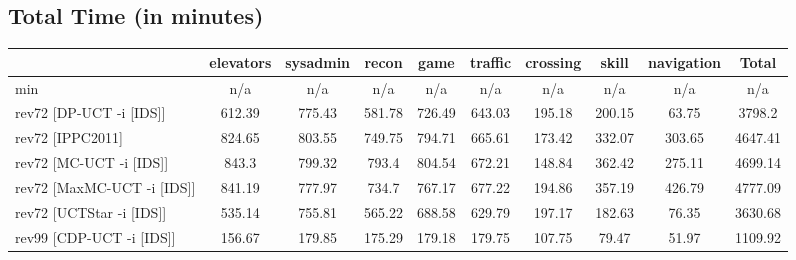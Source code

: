 \documentclass{article}
\begin{document}
\bigskip

\subsection*{Total Time (in minutes)}

\begin{tabular}{|l|r@{$\pm$}rr@{$\pm$}rr@{$\pm$}rr@{$\pm$}rr@{$\pm$}rr@{$\pm$}rr@{$\pm$}rr@{$\pm$}rr@{$\pm$}r|}
\hline

& \multicolumn{2}{c}{elevators}
& \multicolumn{2}{c}{sysadmin}
& \multicolumn{2}{c}{recon}
& \multicolumn{2}{c}{game}
& \multicolumn{2}{c}{traffic}
& \multicolumn{2}{c}{crossing}
& \multicolumn{2}{c}{skill}
& \multicolumn{2}{c}{navigation}
& \multicolumn{2}{c|}{Total}
\\
\hline
\hline
min
& \multicolumn{2}{c}{n/a}
& \multicolumn{2}{c}{n/a}
& \multicolumn{2}{c}{n/a}
& \multicolumn{2}{c}{n/a}
& \multicolumn{2}{c}{n/a}
& \multicolumn{2}{c}{n/a}
& \multicolumn{2}{c}{n/a}
& \multicolumn{2}{c}{n/a}
& \multicolumn{2}{c|}{n/a}
\\
rev72 [DP-UCT -i [IDS]]
& \multicolumn{2}{c}{612.39}
& \multicolumn{2}{c}{775.43}
& \multicolumn{2}{c}{581.78}
& \multicolumn{2}{c}{726.49}
& \multicolumn{2}{c}{643.03}
& \multicolumn{2}{c}{195.18}
& \multicolumn{2}{c}{200.15}
& \multicolumn{2}{c}{63.75}
& \multicolumn{2}{c|}{3798.2}
\\
rev72 [IPPC2011]
& \multicolumn{2}{c}{824.65}
& \multicolumn{2}{c}{803.55}
& \multicolumn{2}{c}{749.75}
& \multicolumn{2}{c}{794.71}
& \multicolumn{2}{c}{665.61}
& \multicolumn{2}{c}{173.42}
& \multicolumn{2}{c}{332.07}
& \multicolumn{2}{c}{303.65}
& \multicolumn{2}{c|}{4647.41}
\\
rev72 [MC-UCT -i [IDS]]
& \multicolumn{2}{c}{843.3}
& \multicolumn{2}{c}{799.32}
& \multicolumn{2}{c}{793.4}
& \multicolumn{2}{c}{804.54}
& \multicolumn{2}{c}{672.21}
& \multicolumn{2}{c}{148.84}
& \multicolumn{2}{c}{362.42}
& \multicolumn{2}{c}{275.11}
& \multicolumn{2}{c|}{4699.14}
\\
rev72 [MaxMC-UCT -i [IDS]]
& \multicolumn{2}{c}{841.19}
& \multicolumn{2}{c}{777.97}
& \multicolumn{2}{c}{734.7}
& \multicolumn{2}{c}{767.17}
& \multicolumn{2}{c}{677.22}
& \multicolumn{2}{c}{194.86}
& \multicolumn{2}{c}{357.19}
& \multicolumn{2}{c}{426.79}
& \multicolumn{2}{c|}{4777.09}
\\
rev72 [UCTStar -i [IDS]]
& \multicolumn{2}{c}{535.14}
& \multicolumn{2}{c}{755.81}
& \multicolumn{2}{c}{565.22}
& \multicolumn{2}{c}{688.58}
& \multicolumn{2}{c}{629.79}
& \multicolumn{2}{c}{197.17}
& \multicolumn{2}{c}{182.63}
& \multicolumn{2}{c}{76.35}
& \multicolumn{2}{c|}{3630.68}
\\
\hline
rev99 [CDP-UCT -i [IDS]]
& \multicolumn{2}{c}{156.67}
& \multicolumn{2}{c}{179.85}
& \multicolumn{2}{c}{175.29}
& \multicolumn{2}{c}{179.18}
& \multicolumn{2}{c}{179.75}
& \multicolumn{2}{c}{107.75}
& \multicolumn{2}{c}{79.47}
& \multicolumn{2}{c}{51.97}
& \multicolumn{2}{c|}{1109.92}
\\
\hline
\end{tabular}%
\end{document}
